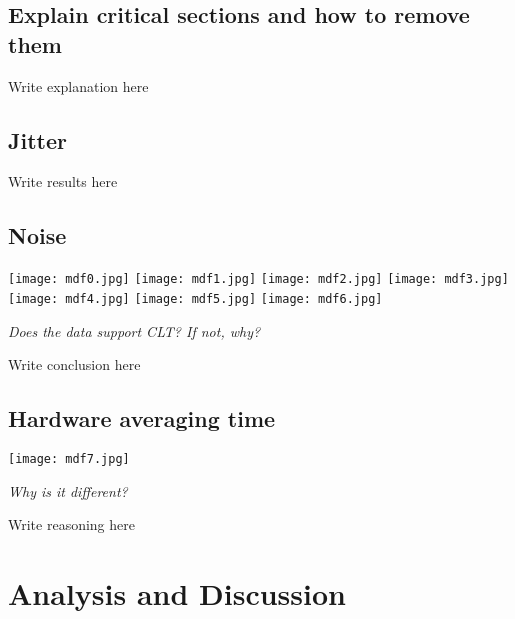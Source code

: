 \documentclass{article}
\begin{document}
\subsection{Explain critical sections and how to remove them}

	Write explanation here %

\subsection{Jitter}

	Write results here %

\subsection{Noise}

	\texttt{[image: mdf0.jpg]} 
	\texttt{[image: mdf1.jpg]} 
	\texttt{[image: mdf2.jpg]} 
	\texttt{[image: mdf3.jpg]} 
	\texttt{[image: mdf4.jpg]} 
	\texttt{[image: mdf5.jpg]} 
	\texttt{[image: mdf6.jpg]} 

	\emph{Does the data support CLT? If not, why?}

	Write conclusion here %

\subsection{Hardware averaging time}

	\texttt{[image: mdf7.jpg]}

	\emph{Why is it different?}

	Write reasoning here %

\section{Analysis and Discussion} %
\end{document}
